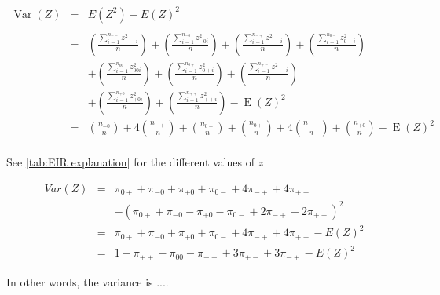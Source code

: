 \documentclass[12pt,a4paper,oneside]{book}
\DeclareMathOperator{\Var}{Var}
\DeclareMathOperator{\E}{E}
\begin{document}



\begin{eqnarray}
\Var(Z) &=&  
	E\left( Z^2\right) - E\left( Z\right)^2 \nonumber \\ \nonumber \\
	&=& \left( \frac{ \sum_{i=1}^{n_{--}} z^2_{--i}}{n} \right)
     + \left( \frac{\sum_{i=1}^{n_{-0}} z^2_{-0i} }{n} \right)
    + \left( \frac{\sum_{i=1}^{n_{-+}} z^2_{-+i}}{n} \right)
    + \left( \frac{\sum_{i=1}^{n_{0-}} z^2_{0-i} }{n} \right)\nonumber  \\
    && + \left( \frac{\sum_{i=1}^{n_{00}} z^2_{00i} }{n} \right) 
      + \left( \frac{\sum_{i=1}^{n_{0+}} z^2_{0+i}}{n} \right)
    + \left( \frac{\sum_{i=1}^{n_{+-}} z^2_{+-i} }{n} \right) \nonumber \\
    && + \left( \frac{\sum_{i=1}^{n_{+0}} z^2_{+0i} }{n} \right)
    + \left( \frac{\sum_{i=1}^{n_{++}} z^2_{++i}}{n} \right)  
     - \E(Z)^2 \\   
     &=& \left(\frac{n_{-0}}{n} \right)
    + 4 \left( \frac{n_{-+}}{n} \right)
    + \left( \frac{n_{0-}}{n} \right) 
    + \left(       \frac{n_{0+}}{n} \right)
    + 4 \left( \frac{n_{+-}}{n} \right)  
    + \left( \frac{n_{+0}}{n} \right) 
     - \E(Z)^2 \nonumber \\
\end{eqnarray}

See \autoref{tab:EIR explanation} for the different values of $z$







\begin{eqnarray}
Var(Z) &=& \pi_{0+} + \pi_{-0} + \pi_{+0} + \pi_{0-} +4\pi_{-+} +4\pi_{+-} \nonumber \nonumber \\ 
&&    - (\pi_{0+} + \pi_{-0} - \pi_{+0} - \pi_{0-} +2\pi_{-+} -2\pi_{+-})^2  \\
&=& \pi_{0+} + \pi_{-0} + \pi_{+0} + \pi_{0-} +4\pi_{-+} +4\pi_{+-} - E(Z)^2  \\
&=& 1 - \pi_{++} - \pi_{00} - \pi_{--} + 3\pi_{+-} + 3\pi_{-+} - E(Z)^2
\end{eqnarray}

In other words, the variance is ....
\end{document}
